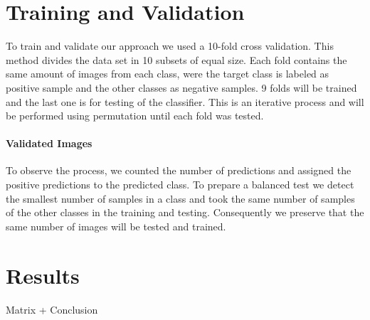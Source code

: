 \documentclass[a4paper,10pt]{article}
\begin{document}
\section{Training and Validation}
To train and validate our approach we used a 10-fold cross validation. 
This method divides the data set in 10 subsets of equal size. Each fold contains the same amount of images from each class, were the target class is labeled as positive sample and the other classes as negative samples. 9 folds will be trained and the last one is for testing of the classifier.
This is an iterative process and will be performed using permutation until each fold was tested.
\paragraph{Validated Images}
To observe the process, we counted the number of predictions and assigned the positive predictions to the predicted class.
To prepare a balanced test we detect the smallest number of samples in a class and took the same number of samples of the other classes in the training and testing. 
Consequently we preserve that the same number of images will be tested and trained.
\section{Results}
Matrix + Conclusion 



\end{document}
